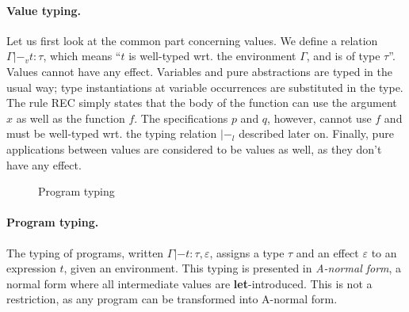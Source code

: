\documentclass[a4paper]{llncs}
\newcommand{\letml}{{\bf let}}
\newcommand{\inml}{{\bf in}}
\newcommand{\ifml}{{\bf if}}
\newcommand{\thenml}{{\bf then}}
\newcommand{\elseml}{{\bf else}}
\newcommand{\boolml}{{\bf bool}}
\newcommand{\alist}[1]{\overline{#1} }
\begin{document}
\paragraph{Value typing.}
Let us first look at the common part concerning values. We define a relation
$Γ|-_v t : τ$, which means ``$t$ is well-typed wrt. the environment $Γ$, and
is of type $τ$''. Values cannot have any effect.  Variables and pure
abstractions are typed in the usual way; type instantiations at variable
occurrences are substituted in the type. The rule {\sc REC} simply states that
the body of the function can use the argument $x$ as well as the function $f$.
The specifications $p$ and $q$, however, cannot use $f$ and must be well-typed
wrt. the typing relation $|-_l$ described later on. Finally, pure applications
between values are considered to be values as well, as they don't have any
effect.

\begin{figure}[tpb]
  \caption{Program typing}
  \label{fig:progtyping}
\end{figure}

\paragraph{Program typing.}
The typing of programs, written $Γ|- t : τ,ε$, assigns a type $τ$ and an
effect $ε$ to an expression $t$, given an environment. This typing is
presented in {\em A-normal form}, a normal form where all intermediate values
are \letml-introduced. This is not a restriction, as any program can be
transformed into A-normal form.
\end{document}
